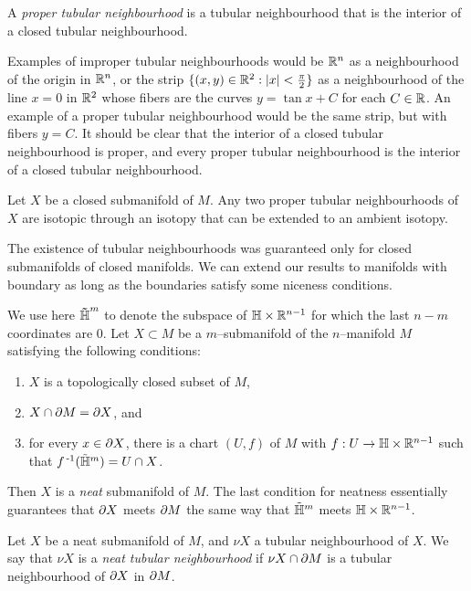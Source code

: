 \begin{defn}
	A \emph{proper tubular neighbourhood} is a tubular neighbourhood that is the interior of a closed tubular neighbourhood.
\end{defn}

Examples of improper tubular neighbourhoods would be $\mathbb{R}^n$ as a neighbourhood of the origin in $\mathbb{R}^n$, or the strip $\{ (x,y)\in \mathbb{R}^2 : |x|< \frac{\pi}{2}\}$ as a neighbourhood of the line $x=0$ in $\mathbb{R}^2$ whose fibers are the curves $y=\tan x + C$ for each $C\in\mathbb{R}$.
An example of a proper tubular neighbourhood would be the same strip, but with fibers $y=C$.
It should be clear that the interior of a closed tubular neighbourhood is proper, and every proper tubular neighbourhood is the interior of a closed tubular neighbourhood.

\begin{theorem}
	Let $X$ be a closed submanifold of $M$.
	Any two proper tubular neighbourhoods of $X$ are isotopic through an isotopy that can be extended to an ambient isotopy.
\end{theorem}

The existence of tubular neighbourhoods was guaranteed only for closed submanifolds of closed manifolds.
We can extend our results to manifolds with boundary as long as the boundaries satisfy some niceness conditions.

\begin{defn}
	We use here $\mathbf{\tilde{\text{$\mathbb{H}$}}}^m$ to denote the subspace of $\mathbb{H}\times\mathbb{R}^{n-1}$ for which the last $n-m$ coordinates are $0$. 
	Let $X\subset M$ be a $m$--submanifold of the $n$--manifold $M$ satisfying the following conditions:
	\begin{enumerate}
		\item $X$ is a topologically closed subset of $M$,
		\item $X\cap \partial M=\partial X$, and
		\item for every $x\in\partial X$, there is a chart $(U,f)$ of $M$ with $f:U\to\mathbb{H}\times\mathbb{R}^{n-1}$ such that $f^{\,\text{-}1}(\tilde{\mathbb{H}}^m)=U\cap X$.
	\end{enumerate}
	Then $X$ is a \emph{neat} submanifold of $M$.
	The last condition for neatness essentially guarantees that $\partial X$ meets $\partial M$ the same way that $\tilde{\mathbb{H}}^m$ meets $\mathbb{H}\times\mathbb{R}^{n-1}$.
\end{defn}

\begin{defn}
	Let $X$ be a neat submanifold of $M$, and $\nu X$ a tubular neighbourhood of $X$.
	We say that $\nu X$ is a \emph{neat tubular neighbourhood} if $\nu X\cap \partial M$ is a tubular neighbourhood of $\partial X$ in $\partial M$.	
\end{defn}

